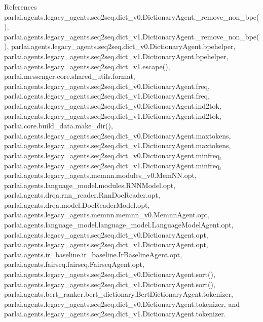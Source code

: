 References parlai.\+agents.\+legacy\+\_\+agents.\+seq2seq.\+dict\+\_\+v0.\+Dictionary\+Agent.\+\_\+remove\+\_\+non\+\_\+bpe(), parlai.\+agents.\+legacy\+\_\+agents.\+seq2seq.\+dict\+\_\+v1.\+Dictionary\+Agent.\+\_\+remove\+\_\+non\+\_\+bpe(), parlai.\+agents.\+legacy\+\_\+agents.\+seq2seq.\+dict\+\_\+v0.\+Dictionary\+Agent.\+bpehelper, parlai.\+agents.\+legacy\+\_\+agents.\+seq2seq.\+dict\+\_\+v1.\+Dictionary\+Agent.\+bpehelper, parlai.\+agents.\+legacy\+\_\+agents.\+seq2seq.\+dict\+\_\+v1.\+escape(), parlai.\+messenger.\+core.\+shared\+\_\+utils.\+format, parlai.\+agents.\+legacy\+\_\+agents.\+seq2seq.\+dict\+\_\+v0.\+Dictionary\+Agent.\+freq, parlai.\+agents.\+legacy\+\_\+agents.\+seq2seq.\+dict\+\_\+v1.\+Dictionary\+Agent.\+freq, parlai.\+agents.\+legacy\+\_\+agents.\+seq2seq.\+dict\+\_\+v0.\+Dictionary\+Agent.\+ind2tok, parlai.\+agents.\+legacy\+\_\+agents.\+seq2seq.\+dict\+\_\+v1.\+Dictionary\+Agent.\+ind2tok, parlai.\+core.\+build\+\_\+data.\+make\+\_\+dir(), parlai.\+agents.\+legacy\+\_\+agents.\+seq2seq.\+dict\+\_\+v0.\+Dictionary\+Agent.\+maxtokens, parlai.\+agents.\+legacy\+\_\+agents.\+seq2seq.\+dict\+\_\+v1.\+Dictionary\+Agent.\+maxtokens, parlai.\+agents.\+legacy\+\_\+agents.\+seq2seq.\+dict\+\_\+v0.\+Dictionary\+Agent.\+minfreq, parlai.\+agents.\+legacy\+\_\+agents.\+seq2seq.\+dict\+\_\+v1.\+Dictionary\+Agent.\+minfreq, parlai.\+agents.\+legacy\+\_\+agents.\+memnn.\+modules\+\_\+v0.\+Mem\+N\+N.\+opt, parlai.\+agents.\+language\+\_\+model.\+modules.\+R\+N\+N\+Model.\+opt, parlai.\+agents.\+drqa.\+rnn\+\_\+reader.\+Rnn\+Doc\+Reader.\+opt, parlai.\+agents.\+drqa.\+model.\+Doc\+Reader\+Model.\+opt, parlai.\+agents.\+legacy\+\_\+agents.\+memnn.\+memnn\+\_\+v0.\+Memnn\+Agent.\+opt, parlai.\+agents.\+language\+\_\+model.\+language\+\_\+model.\+Language\+Model\+Agent.\+opt, parlai.\+agents.\+legacy\+\_\+agents.\+seq2seq.\+dict\+\_\+v0.\+Dictionary\+Agent.\+opt, parlai.\+agents.\+legacy\+\_\+agents.\+seq2seq.\+dict\+\_\+v1.\+Dictionary\+Agent.\+opt, parlai.\+agents.\+ir\+\_\+baseline.\+ir\+\_\+baseline.\+Ir\+Baseline\+Agent.\+opt, parlai.\+agents.\+fairseq.\+fairseq.\+Fairseq\+Agent.\+opt, parlai.\+agents.\+legacy\+\_\+agents.\+seq2seq.\+dict\+\_\+v0.\+Dictionary\+Agent.\+sort(), parlai.\+agents.\+legacy\+\_\+agents.\+seq2seq.\+dict\+\_\+v1.\+Dictionary\+Agent.\+sort(), parlai.\+agents.\+bert\+\_\+ranker.\+bert\+\_\+dictionary.\+Bert\+Dictionary\+Agent.\+tokenizer, parlai.\+agents.\+legacy\+\_\+agents.\+seq2seq.\+dict\+\_\+v0.\+Dictionary\+Agent.\+tokenizer, and parlai.\+agents.\+legacy\+\_\+agents.\+seq2seq.\+dict\+\_\+v1.\+Dictionary\+Agent.\+tokenizer.



